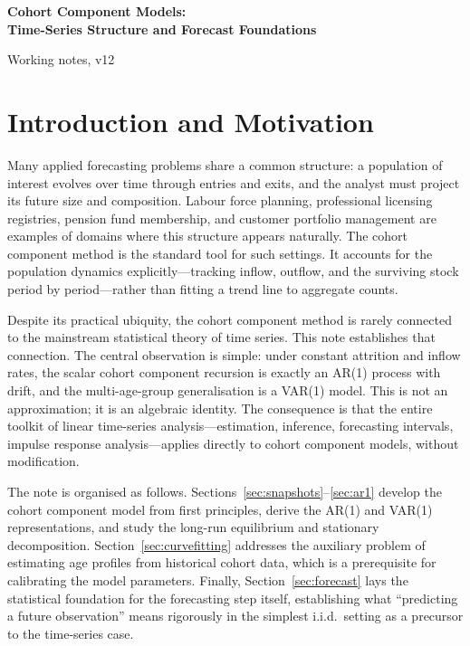 \documentclass[a4paper,oneside,12pt]{extarticle}
\theoremstyle{plain}
\theoremstyle{definition}
\theoremstyle{remark}
\begin{document}
\begin{center}
{\LARGE\bfseries Cohort Component Models:\\[5pt]
Time-Series Structure and Forecast Foundations}

\bigskip
{\small Working notes, v12}
\end{center}

\bigskip
\tableofcontents
\bigskip

\section{Introduction and Motivation}

Many applied forecasting problems share a common structure: a population
of interest evolves over time through entries and exits, and the analyst
must project its future size and composition. Labour force planning,
professional licensing registries, pension fund membership, and customer
portfolio management are examples of domains where this structure appears
naturally. The cohort component method is the standard tool for such
settings. It accounts for the population dynamics explicitly---tracking
inflow, outflow, and the surviving stock period by period---rather than
fitting a trend line to aggregate counts.

Despite its practical ubiquity, the cohort component method is rarely
connected to the mainstream statistical theory of time series. This note
establishes that connection. The central observation is simple: under
constant attrition and inflow rates, the scalar cohort component recursion
is exactly an AR(1) process with drift, and the multi-age-group
generalisation is a VAR(1) model. This is not an approximation; it is an
algebraic identity. The consequence is that the entire toolkit of linear
time-series analysis---estimation, inference, forecasting intervals,
impulse response analysis---applies directly to cohort component models,
without modification.

The note is organised as follows. Sections~\ref{sec:snapshots}--\ref{sec:ar1}
develop the cohort component model from first principles, derive the AR(1)
and VAR(1) representations, and study the long-run equilibrium and
stationary decomposition. Section~\ref{sec:curvefitting} addresses the
auxiliary problem of estimating age profiles from historical cohort data,
which is a prerequisite for calibrating the model parameters. Finally,
Section~\ref{sec:forecast} lays the statistical foundation for the
forecasting step itself, establishing what ``predicting a future
observation'' means rigorously in the simplest i.i.d.\ setting as a
precursor to the time-series case.
\end{document}
